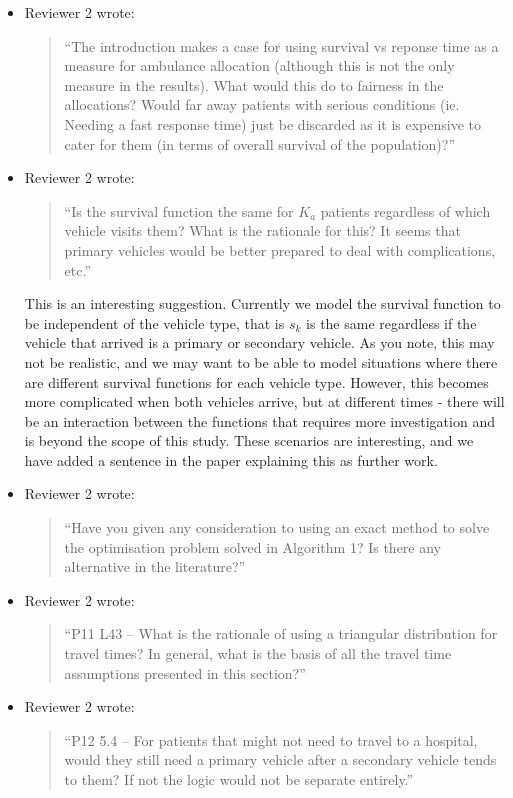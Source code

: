 \documentclass{article}
\begin{document}
\begin{itemize}

\item Reviewer 2 wrote:
\begin{quote}
``The introduction makes a case for using survival vs reponse time as a measure for ambulance allocation (although this is not the only measure in the results). What would this do to fairness in the allocations? Would far away patients with serious conditions (ie. Needing a fast response time) just be discarded as it is expensive to cater for them (in terms of overall survival of the population)?''
\end{quote}

\item Reviewer 2 wrote:
\begin{quote}
``Is the survival function the same for $K_a$ patients regardless of which vehicle visits them? What is the rationale for this? It seems that primary vehicles would be better prepared to deal with complications, etc.''
\end{quote}
This is an interesting suggestion. Currently we model the survival function to be independent of the vehicle type, that is $s_k$ is the same regardless if the vehicle that arrived is a primary or secondary vehicle. As you note, this may not be realistic, and we may want to be able to model situations where there are different survival functions for each vehicle type. However, this becomes more complicated when both vehicles arrive, but at different times - there will be an interaction between the functions that requires more investigation and is beyond the scope of this study. These scenarios are interesting, and we have added a sentence in the paper explaining this as further work.

\item Reviewer 2 wrote:
\begin{quote}
``Have you given any consideration to using an exact method to solve the optimisation problem solved in Algorithm 1? Is there any alternative in the literature?''
\end{quote}

\item Reviewer 2 wrote:
\begin{quote}
``P11 L43 – What is the rationale of using a triangular distribution for travel times? In general, what is the basis of all the travel time assumptions presented in this section?''
\end{quote}

\item Reviewer 2 wrote:
\begin{quote}
``P12 5.4 – For patients that might not need to travel to a hospital, would they still need a primary vehicle after a secondary vehicle tends to them? If not the logic would not be separate entirely.''
\end{quote}


\end{itemize}
\end{document}
